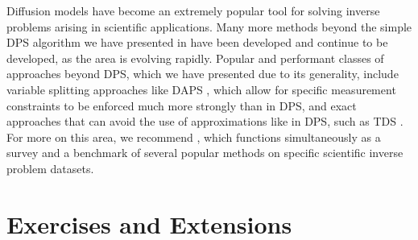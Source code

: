 \documentclass[../../book-main.tex]{subfiles}
\begin{document}
Diffusion models have become an extremely popular tool for solving inverse
problems arising in scientific applications. Many more methods beyond the simple
DPS algorithm we have presented in  have been
developed and continue to be developed, as the area is evolving rapidly.
Popular and performant classes of approaches beyond DPS, which we have presented
due to its generality, include variable splitting approaches like DAPS
\cite{Zhang2024-ha},
which allow for specific measurement constraints to be enforced much more
strongly than in DPS, and exact approaches that can avoid the use of
approximations like in DPS, such as TDS \cite{wu2023practical}.
For more on this area, we recommend \cite{zheng2025inversebench}, which
functions simultaneously as a survey and a benchmark of several popular methods
on specific scientific inverse problem datasets.

\section{Exercises and Extensions}
\end{document}
